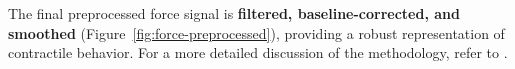 \documentclass{report}
\begin{document}
    The final preprocessed force signal is \textbf{filtered, baseline-corrected, and smoothed} (Figure~\ref{fig:force-preprocessed}), providing a robust representation of contractile behavior. For a more detailed discussion of the methodology, refer to \cite[Section 3.1]{Sarwar2024}.  

\end{document}
